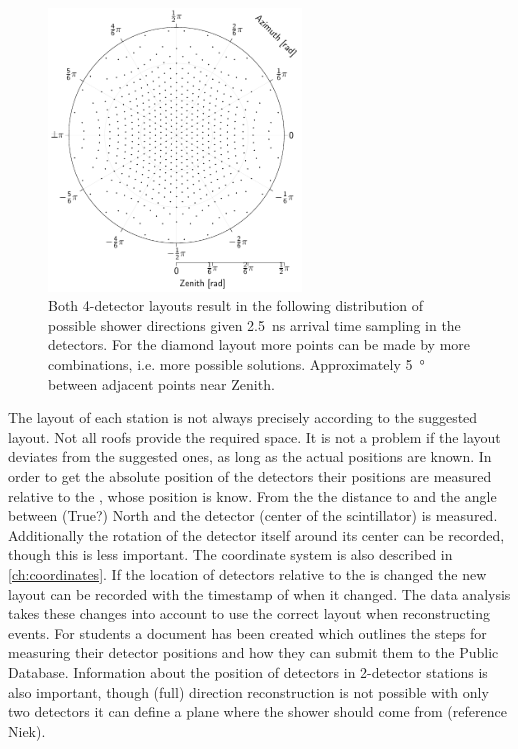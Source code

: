 \begin{figure}
    \centering
    \includegraphics[width=0.6\textwidth]
                    {plots/experiment/discrete_directions}
    \caption{Both 4-detector layouts result in the following distribution of possible shower directions given \SI{2.5}{\ns} arrival time sampling in the detectors. For the diamond layout more points can be made by more combinations, i.e. more possible solutions. Approximately \SI{5}{\degree} between adjacent points near Zenith.}
    \label{fig:discrete_directions}
\end{figure}

The layout of each station is not always precisely according to the suggested layout. Not all roofs provide the required space. It is not a problem if the layout deviates from the suggested ones, as long as the actual positions are known. In order to get the absolute position of the detectors their positions are measured relative to the \gps, whose position is know. From the \gps the distance to and the angle between (True?) North and the detector (center of the scintillator) is measured. Additionally the rotation of the detector itself around its center can be recorded, though this is less important. The coordinate system is also described in \cref{ch:coordinates}. If the location of detectors relative to the \gps is changed the new layout can be recorded with the timestamp of when it changed. The data analysis takes these changes into account to use the correct layout when reconstructing events. For students a document has been created which outlines the steps for measuring their detector positions and how they can submit them to the Public Database. Information about the position of detectors in 2-detector stations is also important, though (full) direction reconstruction is not possible with only two detectors it can define a plane where the shower should come from (reference Niek).


